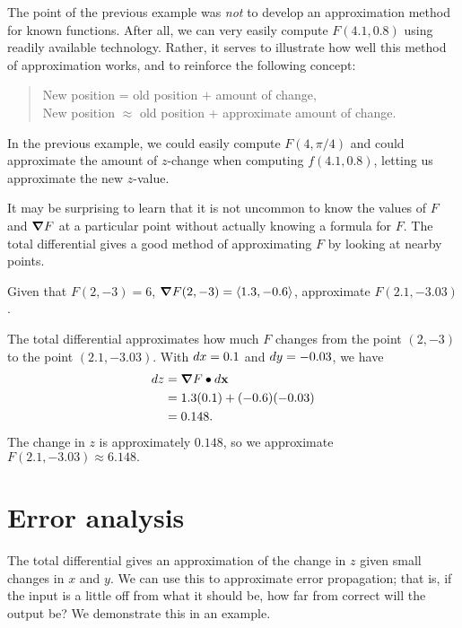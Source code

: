 \documentclass{ximera}
\begin{document}
The point of the previous example was \textit{not} to develop an
approximation method for known functions. After all, we can very
easily compute $F(4.1,0.8)$ using readily available
technology. Rather, it serves to illustrate how well this method of
approximation works, and to reinforce the following concept:
\begin{quote}
  New position = old position $+$ amount of change, \\
  New position $\approx$ old position + approximate amount of change.
\end{quote}

In the previous example, we could easily compute $F(4,\pi/4)$ and
could approximate the amount of $z$-change when computing
$f(4.1,0.8)$, letting us approximate the new $z$-value.

It may be surprising to learn that it is not uncommon to know the
values of $F$ and $\boldsymbol\nabla F$ at a particular point without actually
knowing a formula for $F$. The total differential gives a good method
of approximating $F$ by looking at nearby points.

\begin{example}
  Given that $F(2,-3) = 6$, $\boldsymbol\nabla F(2,-3) = \left\langle 1.3,-0.6\right\rangle$,
  approximate $F(2.1,-3.03)$.
\begin{explanation}
  The total differential approximates how much $F$ changes from the
  point $(2,-3)$ to the point $(2.1,-3.03)$. With $\mathop{}\!d x = 0.1$ and $\mathop{}\!d
  y = -0.03$, we have
  \begin{align*}
    \mathop{}\!d z &= \boldsymbol\nabla F \bullet \mathop{}\!d \mathbf{x}\\
    &= 1.3(0.1) + (-0.6)(-0.03) \\
    &= 0.148.
  \end{align*}
  The change in $z$ is approximately $0.148$, so we approximate
  $F(2.1,-3.03)\approx 6.148.$
\end{explanation}
\end{example}



\section{Error analysis}

The total differential gives an approximation of the change in $z$
given small changes in $x$ and $y$. We can use this to approximate
error propagation; that is, if the input is a little off from what it
should be, how far from correct will the output be? We demonstrate
this in an example.  
\end{document}
